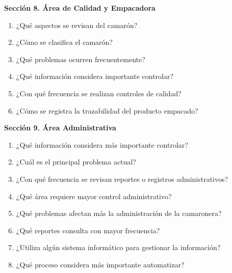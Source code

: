 \documentclass[11pt,a4paper]{article}
\begin{document}
\noindent\textbf{Sección 8. Área de Calidad y Empacadora}
\begin{enumerate}[resume]
  \item ¿Qué aspectos se revisan del camarón?
  \item ¿Cómo se clasifica el camarón?
  \item ¿Qué problemas ocurren frecuentemente?
  \item ¿Qué información considera importante controlar?
  \item ¿Con qué frecuencia se realizan controles de calidad?
  \item ¿Cómo se registra la trazabilidad del producto empacado?
\end{enumerate}

\noindent\textbf{Sección 9. Área Administrativa}
\begin{enumerate}[resume]
  \item ¿Qué información considera más importante controlar?
  \item ¿Cuál es el principal problema actual?
  \item ¿Con qué frecuencia se revisan reportes o registros administrativos?
  \item ¿Qué área requiere mayor control administrativo?
  \item ¿Qué problemas afectan más la administración de la camaronera?
  \item ¿Qué reportes consulta con mayor frecuencia?
  \item ¿Utiliza algún sistema informático para gestionar la información?
  \item ¿Qué proceso considera más importante automatizar?
\end{enumerate}
\end{document}
